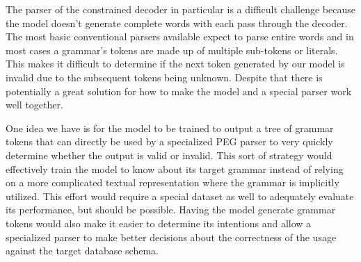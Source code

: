 \documentclass[11pt]{article}
\begin{document}
The parser of the constrained decoder in particular is a difficult challenge because the model doesn't generate complete words with each pass through the decoder. The most basic conventional parsers available expect to parse entire words and in most cases a grammar's tokens are made up of multiple sub-tokens or literals. This makes it difficult to determine if the next token generated by our model is invalid due to the subsequent tokens being unknown. Despite that there is potentially a great solution for how to make the model and a special parser work well together.

One idea we have is for the model to be trained to output a tree of grammar tokens that can directly be used by a specialized PEG parser to very quickly determine whether the output is valid or invalid. This sort of strategy would effectively train the model to know about its target grammar instead of relying on a more complicated textual representation where the grammar is implicitly utilized. This effort would require a special dataset as well to adequately evaluate its performance, but should be possible. Having the model generate grammar tokens would also make it easier to determine its intentions and allow a specialized parser to make better decisions about the correctness of the usage against the target database schema.





\end{document}
